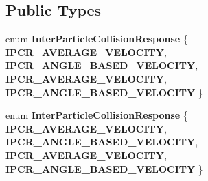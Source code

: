 \subsection*{Public Types}
\begin{DoxyCompactItemize}
\item 
\mbox{\label{classPUParticle3DInterParticleCollider_a40d480a696702c49bbcf57dba43f5dd2}} 
enum {\bfseries Inter\+Particle\+Collision\+Response} \{ {\bfseries I\+P\+C\+R\+\_\+\+A\+V\+E\+R\+A\+G\+E\+\_\+\+V\+E\+L\+O\+C\+I\+TY}, 
{\bfseries I\+P\+C\+R\+\_\+\+A\+N\+G\+L\+E\+\_\+\+B\+A\+S\+E\+D\+\_\+\+V\+E\+L\+O\+C\+I\+TY}, 
{\bfseries I\+P\+C\+R\+\_\+\+A\+V\+E\+R\+A\+G\+E\+\_\+\+V\+E\+L\+O\+C\+I\+TY}, 
{\bfseries I\+P\+C\+R\+\_\+\+A\+N\+G\+L\+E\+\_\+\+B\+A\+S\+E\+D\+\_\+\+V\+E\+L\+O\+C\+I\+TY}
 \}
\item 
\mbox{\label{classPUParticle3DInterParticleCollider_a40d480a696702c49bbcf57dba43f5dd2}} 
enum {\bfseries Inter\+Particle\+Collision\+Response} \{ {\bfseries I\+P\+C\+R\+\_\+\+A\+V\+E\+R\+A\+G\+E\+\_\+\+V\+E\+L\+O\+C\+I\+TY}, 
{\bfseries I\+P\+C\+R\+\_\+\+A\+N\+G\+L\+E\+\_\+\+B\+A\+S\+E\+D\+\_\+\+V\+E\+L\+O\+C\+I\+TY}, 
{\bfseries I\+P\+C\+R\+\_\+\+A\+V\+E\+R\+A\+G\+E\+\_\+\+V\+E\+L\+O\+C\+I\+TY}, 
{\bfseries I\+P\+C\+R\+\_\+\+A\+N\+G\+L\+E\+\_\+\+B\+A\+S\+E\+D\+\_\+\+V\+E\+L\+O\+C\+I\+TY}
 \}
\end{DoxyCompactItemize}
